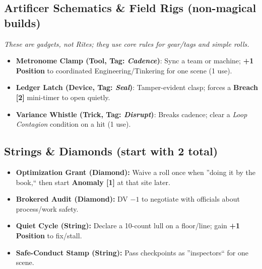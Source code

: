 \documentclass[11pt]{article}
\begin{document}
\subsection*{Artificer Schematics \& Field Rigs (non-magical builds)}
\textit{These are gadgets, not Rites; they use core rules for gear/tags and simple rolls.}
\begin{itemize}[leftmargin=*]
  \item \textbf{Metronome Clamp (Tool, Tag: \emph{Cadence})}: Sync a team or machine; \textbf{+1 Position} to coordinated Engineering/Tinkering for one scene (1 use).
  \item \textbf{Ledger Latch (Device, Tag: \emph{Seal})}: Tamper-evident clasp; forces a \textbf{Breach [2]} mini-timer to open quietly.
  \item \textbf{Variance Whistle (Trick, Tag: \emph{Disrupt})}: Breaks cadence; clear a \emph{Loop Contagion} condition on a hit (1 use).
\end{itemize}

\subsection*{Strings \& Diamonds (start with 2 total)}
\begin{itemize}[leftmargin=*]
  \item \textbf{Optimization Grant (Diamond):} Waive a roll once when ''doing it by the book,`` then start \textbf{Anomaly [1]} at that site later.
  \item \textbf{Brokered Audit (Diamond):} DV \(-1\) to negotiate with officials about process/work safety.
  \item \quad \textbf{Quiet Cycle (String):} Declare a 10-count lull on a floor/line; gain \textbf{+1 Position} to fix/stall.
  \item \textbf{Safe-Conduct Stamp (String):} Pass checkpoints as ''inspectors`` for one scene.
\end{itemize}
\end{document}
